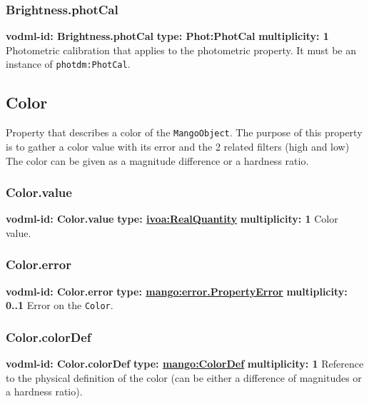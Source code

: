     \subsubsection{Brightness.photCal}
      \textbf{vodml-id: Brightness.photCal} \newline
      \textbf{type: Phot:PhotCal} \newline
      \textbf{multiplicity: 1} \newline
      Photometric calibration that applies to the photometric property. It must be an instance of \texttt{photdm:PhotCal}.

  \subsection{Color}
  \label{sect:Color}
    Property that describes a color of the \texttt{MangoObject}. The purpose of this property is to gather a color value with its error and the 2 related filters (high and low) The color can be given as a magnitude difference or a hardness ratio.

    \subsubsection{Color.value}
      \textbf{vodml-id: Color.value} \newline
      \textbf{type: \hyperref[sect:ivoa]{ivoa:RealQuantity}} \newline
      \textbf{multiplicity: 1} \newline
      Color value.

    \subsubsection{Color.error}
      \textbf{vodml-id: Color.error} \newline
      \textbf{type: \hyperref[sect:error.PropertyError]{mango:error.PropertyError}} \newline
      \textbf{multiplicity: 0..1} \newline
      Error on the \texttt{Color}.

    \subsubsection{Color.colorDef}
      \textbf{vodml-id: Color.colorDef} \newline
      \textbf{type: \hyperref[sect:ColorDef]{mango:ColorDef}} \newline
      \textbf{multiplicity: 1} \newline
      Reference to the physical definition of the color (can be either a difference of magnitudes or a hardness ratio).

